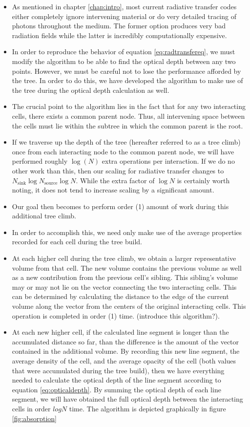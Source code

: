 \begin{itemize}
\item As mentioned in chapter \ref{chap:intro}, most current radiative transfer codes either completely ignore intervening material or do very detailed tracing of photons throughout the medium. The former option produces very bad radiation fields while the latter is incredibly computationally expensive.
\item In order to reproduce the behavior of equation \ref{eq:radtransfereq}, we must modify the algorithm to be able to find the optical depth between any two points. However, we must be careful not to lose the performance afforded by the tree. In order to do this, we have developed the algorithm to make use of the tree during the optical depth calculation as well.
\item The crucial point to the algorithm lies in the fact that for any two interacting cells, there exists a common parent node. Thus, all intervening space between the cells must lie within the subtree in which the common parent is the root.
\item If we traverse up the depth of the tree (hereafter referred to as a tree climb) once from each interacting node to the common parent node, we will have performed roughly $\log(N)$ extra operations per interaction. If we do no other work than this, then our scaling for radiative transfer changes to $N_{\mbox{sink}}\log{N_{\mbox{source}}}\log{N}$. While the extra factor of $\log{N}$ is certainly worth noting, it does not tend to increase scaling by a significant amount.
\item Our goal then becomes to perform order (1) amount of work during this additional tree climb.
\item In order to accomplish this, we need only make use of the average properties recorded for each cell during the tree build.
\item At each higher cell during the tree climb, we obtain a larger representative volume from that cell. The new volume contains the previous volume as well as a new contribution from the previous cell's sibling. This sibling's volume may or may not lie on the vector connecting the two interacting cells. This can be determined by calculating the distance to the edge of the current volume along the vector from the centers of the original interacting cells. This operation is completed in order (1) time. (introduce this algorithm?).
\item At each new higher cell, if the calculated line segment is longer than the accumulated distance so far, than the difference is the amount of the vector contained in the additional volume. By recording this new line segment, the average density of the cell, and the average opacity of the cell (both values that were accumulated during the tree build), then we have everything needed to calculate the optical depth of the line segment according to equation \ref{eq:opticaldepth}. By summing the optical depth of each line segment, we will have obtained the full optical depth between the interacting cells in order $log{N}$ time. The algorithm is depicted graphically in figure \ref{fig:absorption}
\end{itemize}

